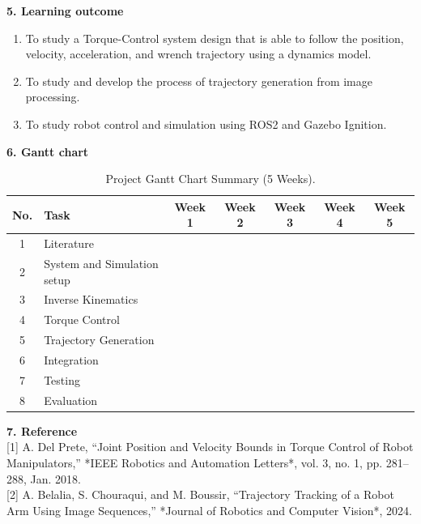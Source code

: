 \documentclass[10pt]{article}
\begin{document}
\large
\noindent
\textbf{5. Learning outcome} \\
\normalsize
\begin{enumerate}[nosep, itemsep=-2pt]
    \item To study a Torque-Control system design that is able to follow the position, velocity, acceleration, and wrench trajectory using a dynamics model. 
    \item To study and develop the process of trajectory generation from image processing.
    \item To study robot control and simulation using ROS2 and Gazebo Ignition.
\end{enumerate}

\large
\noindent
\textbf{6. Gantt chart} \\
\normalsize
\renewcommand{\figurename}{Table} %
\begin{table}[h]
\centering
\begin{tabular}{|c|l|c|c|c|c|c|}
\hline
\textbf{No.} & \textbf{Task} & \textbf{Week 1} & \textbf{Week 2} & \textbf{Week 3} & \textbf{Week 4} & \textbf{Week 5} \\ \hline
1 & Literature & \cellcolor{ganttbar} &  &  &  &  \\ \hline
2 & System and Simulation setup & \cellcolor{ganttbar} &  &  &  &  \\ \hline
3 & Inverse Kinematics &  & \cellcolor{ganttbar} &  &  &  \\ \hline
4 & Torque Control &  & \cellcolor{ganttbar} & \cellcolor{ganttbar}  &  &  \\ \hline
5 & Trajectory Generation &  & \cellcolor{ganttbar} & \cellcolor{ganttbar}  &  &  \\ \hline
6 & Integration &  &  & \cellcolor{ganttbar} &  &  \\ \hline
7 & Testing &  &  &  & \cellcolor{ganttbar} &  \\ \hline
8 & Evaluation &  &  &  &  & \cellcolor{ganttbar} \\ \hline
\end{tabular}
\caption{Project Gantt Chart Summary (5 Weeks).}
\label{tab:gantt_excel}
\end{table}

\newpage

\large
\noindent
\textbf{7. Reference} \\
\normalsize 
[1] A. Del Prete, “Joint Position and Velocity Bounds in Torque Control of Robot Manipulators,” *IEEE Robotics and Automation Letters*, vol. 3, no. 1, pp. 281–288, Jan. 2018. \\

[2] A. Belalia, S. Chouraqui, and M. Boussir, “Trajectory Tracking of a Robot Arm Using Image Sequences,” *Journal of Robotics and Computer Vision*, 2024. \\
\end{document}

